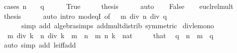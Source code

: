 \begin{isabellebody}
%
\isadelimproof
%
\endisadelimproof
%
\isatagproof
{}\isamarkupfalse%
\ {\isacharparenleft}{\kern0pt}cases\ {\isachardoublequoteopen}n\ {\isacharequal}{\kern0pt}\ {}\ {\isasymor}\ q\ {\isacharequal}{\kern0pt}\ {}{\isachardoublequoteclose}{\isacharparenright}{\kern0pt}\isanewline
\ \ \isamarkupfalse%
\ True\isanewline
\ \ \isamarkupfalse%
\ \isamarkupfalse%
\ {\isacharquery}{\kern0pt}thesis\isanewline
\ \ \ \ \isamarkupfalse%
\ auto\isanewline
{}\isamarkupfalse%
\isanewline
\ \ \isamarkupfalse%
\ False\isanewline
\ \ \isamarkupfalse%
\ eucl{\isacharunderscore}{\kern0pt}rel{\isacharunderscore}{\kern0pt}mult{}\ \isamarkupfalse%
\ {\isacharquery}{\kern0pt}thesis\isanewline
\ \ \ \ \isamarkupfalse%
\ {\isacharparenleft}{\kern0pt}auto\ intro{\isacharcolon}{\kern0pt}\ mod{\isacharunderscore}{\kern0pt}eqI\ {\isacharbrackleft}{\kern0pt}of\ {\isacharunderscore}{\kern0pt}\ {\isacharunderscore}{\kern0pt}\ {\isachardoublequoteopen}{\isacharparenleft}{\kern0pt}m\ div\ n{\isacharparenright}{\kern0pt}\ div\ q{\isachardoublequoteclose}{\isacharbrackright}{\kern0pt}\isanewline
\ \ \ \ \ \ simp\ add{\isacharcolon}{\kern0pt}\ algebra{\isacharunderscore}{\kern0pt}simps\ add{\isacharunderscore}{\kern0pt}mult{\isacharunderscore}{\kern0pt}distrib{}\ {\isacharbrackleft}{\kern0pt}symmetric{\isacharbrackright}{\kern0pt}{\isacharparenright}{\kern0pt}\isanewline
{}\isamarkupfalse%
%
\endisatagproof
{\isafoldproof}%
%
\isadelimproof
\isanewline
%
\endisadelimproof
\isanewline
{}\isamarkupfalse%
\isanewline
\isanewline
{}\isamarkupfalse%
\ div{\isacharunderscore}{\kern0pt}le{\isacharunderscore}{\kern0pt}mono{\isacharcolon}{\kern0pt}\isanewline
\ \ {\isachardoublequoteopen}m\ div\ k\ {\isasymle}\ n\ div\ k{\isachardoublequoteclose}\ \ {\isachardoublequoteopen}m\ {\isasymle}\ n{\isachardoublequoteclose}\ \ m\ n\ k\ {\isacharcolon}{\kern0pt}{\isacharcolon}{\kern0pt}\ nat\isanewline
%
\isadelimproof
%
\endisadelimproof
%
\isatagproof
{}\isamarkupfalse%
\ {\isacharminus}{\kern0pt}\isanewline
\ \ \isamarkupfalse%
\ that\ \isamarkupfalse%
\ q\ \ {\isachardoublequoteopen}n\ {\isacharequal}{\kern0pt}\ m\ {\isacharplus}{\kern0pt}\ q{\isachardoublequoteclose}\isanewline
\ \ \ \ \isamarkupfalse%
\ {\isacharparenleft}{\kern0pt}auto\ simp\ add{\isacharcolon}{\kern0pt}\ le{\isacharunderscore}{\kern0pt}iff{\isacharunderscore}{\kern0pt}add{\isacharparenright}{\kern0pt}\isanewline

\end{isabellebody}
